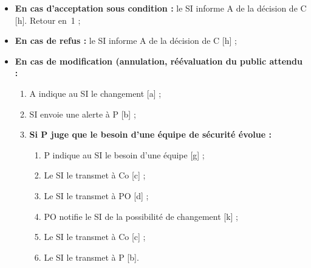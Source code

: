 \begin{enumerate}
\begin{itemize}
	\item \textbf{En cas d'acceptation sous condition :}
	              le SI informe A de la décision de C [h]. Retour en~1 ;
	\item \textbf{En cas de refus :} le SI informe A de la décision de C [h] ;
	\item \textbf{En cas de modification (annulation, réévaluation du public attendu :}
	\begin{enumerate}
		\item A indique au SI le changement [a] ;
		\item SI envoie une alerte à P [b] ;
		\item \textbf{Si P juge que le besoin d'une équipe de sécurité évolue :}
		\begin{enumerate}
			\item P indique au SI le besoin d'une équipe [g] ;
			\item Le SI le transmet à Co [c] ;
			\item Le SI le transmet à PO [d] ;
			\item PO notifie le SI de la possibilité de changement [k] ;
			\item Le SI le transmet à Co [c] ;
			\item Le SI le transmet à P [b].
		\end{enumerate}
	\end{enumerate}

\end{itemize}
\end{enumerate}



